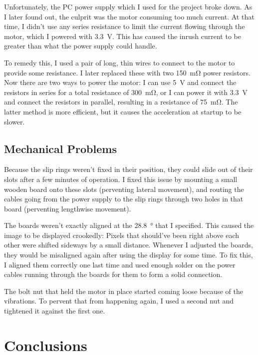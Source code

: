 \documentclass[a4paper, 11pt, titlepage]{report}
\begin{document}
Unfortunately, the PC power supply which I used for the project broke down. As I later found out,
the culprit was the motor consuming too much current. At that time, I didn't use any series
resistance to limit the current flowing through the motor, which I powered with \SI{3.3}{\volt}.
This has caused the inrush current to be greater than what the power supply could handle.

To remedy this, I used a pair of long, thin wires to connect to the motor to provide some
resistance. I later replaced these with two \SI{150}{\milli\ohm} power resistors. Now there are two
ways to power the motor: I can use \SI{5}{\volt} and connect the resistors in series for a total
resistance of \SI{300}{\milli\ohm}, or I can power it with \SI{3.3}{\volt} and connect the
resistors in parallel, resulting in a resistance of \SI{75}{\milli\ohm}. The latter method is more
efficient, but it causes the acceleration at startup to be slower.


\section{Mechanical Problems}

Because the slip rings weren't fixed in their position, they could slide out of their slots after
a few minutes of operation. I fixed this issue by mounting a small wooden board onto these slots
(perventing lateral movement), and routing the cables going from the power supply to the slip rings
through two holes in that board (perventing lengthwise movement).

The boards weren't exactly aligned at the \SI{28.8}{\degree} that I specified. This caused the
image to be displayed crookedly: Pixels that should've been right above each other were shifted
sideways by a small distance. Whenever I adjusted the boards, they would be misaligned again after
using the display for some time. To fix this, I aligned them correctly one last time and used
enough solder on the power cables running through the boards for them to form a solid connection.

The bolt nut that held the motor in place started coming loose because of the vibrations. To
pervent that from happening again, I used a second nut and tightened it against the first one.


\chapter{Conclusions}
\end{document}
